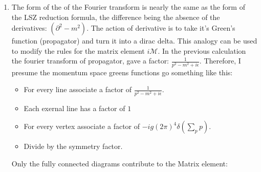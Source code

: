 \documentclass[12pt,a4]{article}
\begin{document}
\begin{enumerate}
\begin{enumerate}
\begin{enumerate}
          \item
            The form of the of the Fourier transform is nearly the same as the form of the LSZ reduction formula, the difference being the absence of the derivatives: $(\partial^2 - m^2)$.
            The action of derivative is to take it's Green's function (propagator) and turn it into a dirac delta.
            This analogy can be used to modify the rules for the matrix element $i \mathcal{M}$.
            In the previous calculation the fourier transform of propagator, gave a factor: $\frac{1}{p^2 - m^2 + i\epsilon}$.
            Therefore, I presume the momentum space greens functions go something like this:
            \begin{itemize}
              \item For every line associate a factor of $\frac{1}{p^2 - m^2 + i\epsilon}$.
              \item Each exernal line has a factor of $1$
              \item For every vertex associate a factor of $- i g (2 \pi)^4 \delta(\sum_p p)$.
              \item Divide by the symmetry factor.
            \end{itemize}
            Only the fully connected diagrams contribute to the Matrix element:\\
            \begin{center}
            \end{center}


\end{enumerate}
\end{enumerate}
\end{enumerate}
\end{document}
